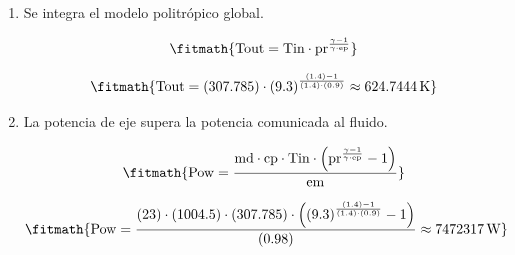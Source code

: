 \begin{enumerate}

\item Se integra el modelo politrópico global.

\[\fitmath{\mathrm{Tout}=\mathrm{Tin}\cdot {\mathrm{pr}}^{\frac{\gamma-1}{\gamma\cdot \mathrm{ep}}}}\]

\[\fitmath{\mathrm{Tout}=(307.785)\cdot {(9.3)}^{\frac{(1.4)-1}{(1.4)\cdot (0.9)}}\approx 624.7444\,\mathrm{K}}\]

\item La potencia de eje supera la potencia comunicada al fluido.

\[\fitmath{\mathrm{Pow}=\frac{\mathrm{md}\cdot \mathrm{cp}\cdot \mathrm{Tin}\cdot \left({\mathrm{pr}}^{\frac{\gamma-1}{\gamma\cdot \mathrm{ep}}}-1\right)}{\mathrm{em}}}\]

\[\fitmath{\mathrm{Pow}=\frac{(23)\cdot (1004.5)\cdot (307.785)\cdot \left({(9.3)}^{\frac{(1.4)-1}{(1.4)\cdot (0.9)}}-1\right)}{(0.98)}\approx 7472317\,\mathrm{W}}\]

\end{enumerate}
